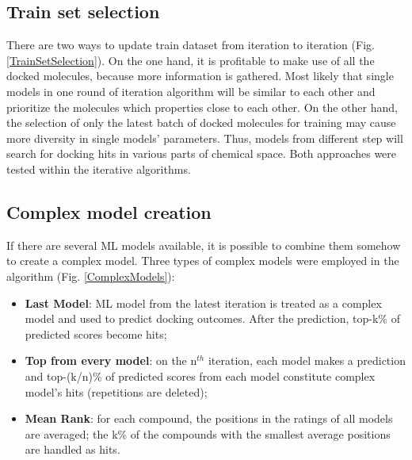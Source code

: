\subsection{Train set selection}
There are two ways to update train dataset from iteration to iteration (Fig. \ref{TrainSetSelection}).
On the one hand, it is profitable to make use of all the docked molecules, because more information is gathered.
Most likely that single models in one round of iteration algorithm will be similar to each other and prioritize the molecules which properties close to each other.
On the other hand, the selection of only the latest batch of docked molecules for training may cause more diversity in single models' parameters.
Thus, models from different step will search for docking hits in various parts of chemical space.
Both approaches were tested within the iterative algorithms.\\

\subsection{Complex model creation}
If there are several ML models available, it is possible to combine them somehow to create a complex model.
Three types of complex models were employed in the algorithm (Fig. \ref{ComplexModels}):
\begin{itemize}
    \item \textbf{Last Model}: ML model from the latest iteration is treated as a complex model and used to predict docking outcomes.
    After the prediction, top-k\% of predicted scores become hits;
    \item \textbf{Top from every model}: on the $\text{n}^{th}$ iteration, each model makes a prediction and top-(k/n)\% of predicted scores from each model constitute complex model's hits (repetitions are deleted);
    \item \textbf{Mean Rank}: for each compound, the positions in the ratings of all models are averaged; the k\% of the compounds with the smallest average positions are handled as hits.
\end{itemize}

